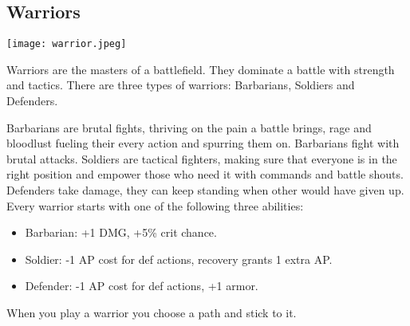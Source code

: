 
\pagebreak
\subsection{Warriors}

\texttt{[image: warrior.jpeg]}

Warriors are the masters of a battlefield. They dominate a battle with strength and tactics. There are three types of warriors: Barbarians, Soldiers and Defenders.

Barbarians are brutal fights, thriving on the pain a battle brings, rage and bloodlust fueling their every action and spurring them on. Barbarians fight with brutal attacks. Soldiers are tactical fighters, making sure that everyone is in the right position and empower those who need it with commands and battle shouts. Defenders take damage, they can keep standing when other would have given up.
Every warrior starts with one of the following three abilities:

\begin{itemize}
\item Barbarian: +1 DMG, +5\% crit chance.
\item Soldier: -1 AP cost for def actions, recovery grants 1 extra AP.
\item Defender: -1 AP cost for def actions, +1 armor.
\end{itemize}

\bigskip

When you play a warrior you choose a path and stick to it. 

\bigskip

